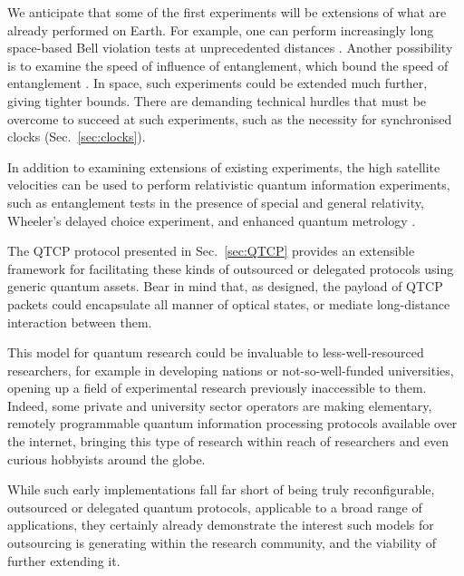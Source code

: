 We anticipate that some of the first experiments will be extensions of what are already performed on Earth. For example, one can perform increasingly long space-based Bell violation tests at unprecedented distances \cite{bib:yin2017satellite}. Another possibility is to examine the speed of influence of entanglement, which bound the speed of entanglement \cite{bib:yin2013lower}. In space, such experiments could be extended much further, giving tighter bounds. There are demanding technical hurdles that must be overcome to succeed at such experiments, such as the necessity for synchronised clocks (Sec.~\ref{sec:clocks}).

 In addition to examining extensions of existing experiments, the high satellite velocities can be used to perform relativistic quantum information experiments, such as entanglement tests in the presence of special and general relativity, Wheeler's delayed choice experiment, and enhanced quantum metrology \cite{sec:kaltenbaek2003proof, sec:scheidl2013quantum, sec:ahmadi2014relativistic}.

The QTCP protocol presented in Sec.~\ref{sec:QTCP} provides an extensible framework for facilitating these kinds of outsourced or delegated protocols using generic quantum assets. Bear in mind that, as designed, the payload of QTCP packets could encapsulate all manner of optical states, or mediate long-distance interaction between them.

This model for quantum research could be invaluable to less-well-resourced researchers, for example in developing nations or not-so-well-funded universities, opening up a field of experimental research previously inaccessible to them. Indeed, some private and university sector operators are making elementary, remotely programmable quantum information processing protocols available over the internet, bringing this type of research within reach of researchers and even curious hobbyists around the globe.

While such early implementations fall far short of being truly reconfigurable, outsourced or delegated quantum protocols, applicable to a broad range of applications, they certainly already demonstrate the interest such models for outsourcing is generating within the research community, and the viability of further extending it.

